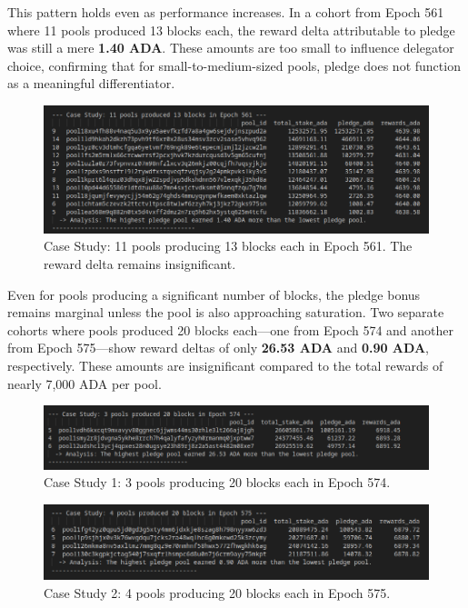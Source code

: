 \documentclass[11pt, letterpaper]{article}
\begin{document}
This pattern holds even as performance increases. In a cohort from Epoch 561
where 11 pools produced 13 blocks each, the reward delta attributable to pledge
was still a mere \textbf{1.40 ADA}. These amounts are too small to influence
delegator choice, confirming that for small-to-medium-sized pools, pledge does
not function as a meaningful differentiator.

\begin{figure}[H]
	\centering
	\includegraphics[width=\textwidth]{img/13blocks-e561.png}
	\caption{Case Study: 11 pools producing 13 blocks each in Epoch 561. The reward delta remains insignificant.}
	\label{fig:13blocks-e561}
\end{figure}

Even for pools producing a significant number of blocks, the pledge bonus
remains marginal unless the pool is also approaching saturation. Two separate
cohorts where pools produced 20 blocks each—one from Epoch 574 and another from
Epoch 575—show reward deltas of only \textbf{26.53 ADA} and \textbf{0.90 ADA},
respectively. These amounts are insignificant compared to the total rewards of
nearly 7,000 ADA per pool.

\begin{figure}[H]
	\centering
	\includegraphics[width=\textwidth]{img/20blocks-e574.png}
	\caption{Case Study 1: 3 pools producing 20 blocks each in Epoch 574.}
	\label{fig:20blocks-e574}
\end{figure}

\begin{figure}[H]
	\centering
	\includegraphics[width=\textwidth]{img/20blocks-e575.png}
	\caption{Case Study 2: 4 pools producing 20 blocks each in Epoch 575.}
	\label{fig:20blocks-e575}
\end{figure}
\end{document}
